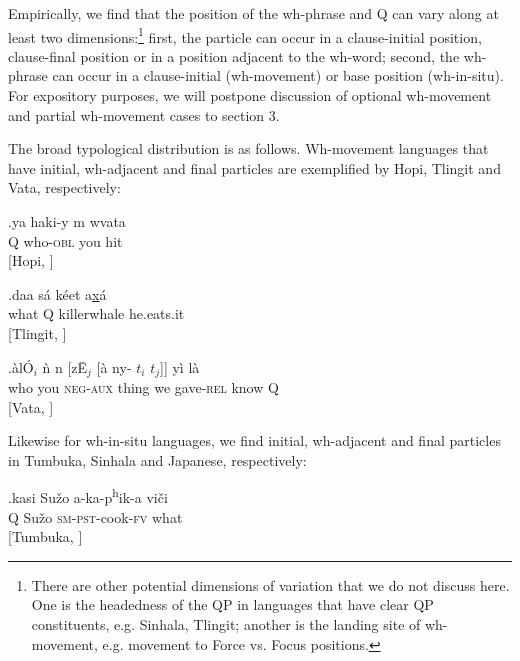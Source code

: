 \documentclass[charis]{glossa}
\begin{document}
Empirically, we find that the position of the wh-phrase and Q can vary along at least two dimensions:\footnote{There are other potential dimensions of variation that we do not discuss here. One is the headedness of the QP in languages that have clear QP constituents, e.g. Sinhala, Tlingit; another is the landing site of wh-movement, e.g. movement to Force vs. Focus positions.} first, the particle can occur in a clause-initial position, clause-final position or in a position adjacent to the wh-word; second, the wh-phrase can occur in a clause-initial (wh-movement) or base position (wh-in-situ). For expository purposes, we will postpone discussion of optional wh-movement and partial wh-movement cases to section 3.

The broad typological distribution is as follows. Wh-movement languages that have initial, wh-adjacent and final particles are exemplified by Hopi, Tlingit and Vata, respectively:


\exg.\label{wh.50}ya haki-y {\textraiseglotstop\textbari}m w{\textbari}va{\textraiseglotstop}ta \\
  Q who-\textsc{obl} you hit \\
  \hspace{\fill}[Hopi, \cite{jeanne:1978}]

\exg.\label{wh.60}daa s\'a k\'eet a\underline{x}\'a \\
  what Q killerwhale he.eats.it \\
  \hspace{\fill}[Tlingit, \cite{cable:2007}]

\exg.\label{wh.70}\`al\'O$_i$ \`n n{} [z\={E}$_j$ [\`a ny{}-{} $t_i$ $t_j$]] y\`i l\`a\\
  who you \textsc{neg-aux} thing we gave-\textsc{rel} {} {} know Q \\
  \hspace{\fill}[Vata, \cite{koopman:1984}]

Likewise for wh-in-situ languages, we find initial, wh-adjacent and final particles in Tumbuka, Sinhala and Japanese, respectively:

\exg.\label{wh.80}kasi Su\v{z}o a-ka-p\textsuperscript{h}ik-a vi\v{c}i \\
  Q Su\v{z}o \textsc{sm-pst}-cook-\textsc{fv} what \\
  \hspace{\fill}[Tumbuka, \cite{kimper:2006}]
\end{document}
